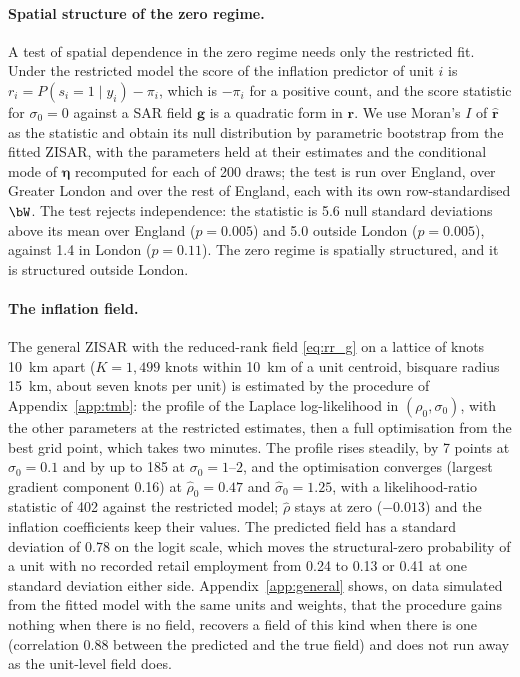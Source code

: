 \paragraph{Spatial structure of the zero regime.}
A test of spatial dependence in the zero regime needs only the restricted fit.
Under the restricted model the score of the inflation predictor of unit $i$ is $r_i = P(s_i = 1\mid y_i) - \pi_i$, which is $-\pi_i$ for a positive count, and the score statistic for $\sigma_0 = 0$ against a SAR field $\mathbf{g}$ is a quadratic form in $\mathbf{r}$.
We use Moran's $I$ of $\hat{\mathbf{r}}$ as the statistic and obtain its null distribution by parametric bootstrap from the fitted ZISAR, with the parameters held at their estimates and the conditional mode of $\boldsymbol\eta$ recomputed for each of 200 draws; the test is run over England, over Greater London and over the rest of England, each with its own row-standardised $\bW$.
The test rejects independence: the statistic is 5.6 null standard deviations above its mean over England ($p = 0.005$) and 5.0 outside London ($p = 0.005$), against 1.4 in London ($p = 0.11$).
The zero regime is spatially structured, and it is structured outside London.

\paragraph{The inflation field.}
The general ZISAR with the reduced-rank field \eqref{eq:rr_g} on a lattice of knots 10~km apart ($K = 1{,}499$ knots within 10~km of a unit centroid, bisquare radius 15~km, about seven knots per unit) is estimated by the procedure of Appendix~\ref{app:tmb}: the profile of the Laplace log-likelihood in $(\rho_0, \sigma_0)$, with the other parameters at the restricted estimates, then a full optimisation from the best grid point, which takes two minutes.
The profile rises steadily, by 7 points at $\sigma_0 = 0.1$ and by up to 185 at $\sigma_0 = 1$--$2$, and the optimisation converges (largest gradient component 0.16) at $\hat\rho_0 = 0.47$ and $\hat\sigma_0 = 1.25$, with a likelihood-ratio statistic of 402 against the restricted model; $\hat\rho$ stays at zero ($-0.013$) and the inflation coefficients keep their values.
The predicted field has a standard deviation of 0.78 on the logit scale, which moves the structural-zero probability of a unit with no recorded retail employment from 0.24 to 0.13 or 0.41 at one standard deviation either side.
Appendix~\ref{app:general} shows, on data simulated from the fitted model with the same units and weights, that the procedure gains nothing when there is no field, recovers a field of this kind when there is one (correlation 0.88 between the predicted and the true field) and does not run away as the unit-level field does.

